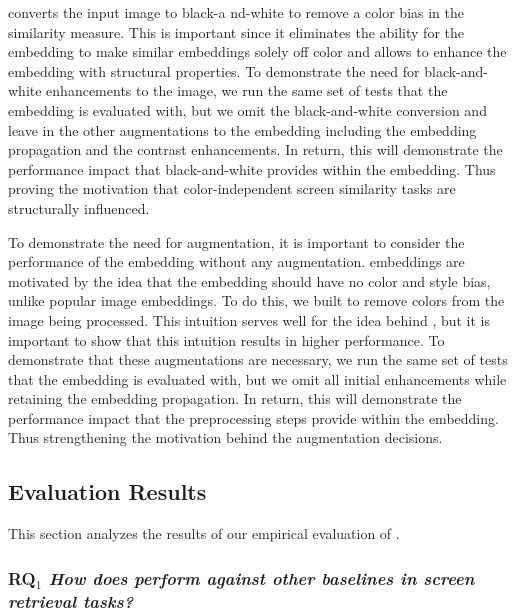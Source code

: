 \FRAME converts the input image to black-a
nd-white to remove a color bias in the similarity measure. This is important since it eliminates the ability for the embedding to make similar embeddings solely off color and allows \FRAME to enhance the embedding with structural properties. To demonstrate the need for black-and-white enhancements to the image, we run the same set of tests that the \FRAME embedding is evaluated with, but we omit the black-and-white conversion and leave in the other augmentations to the embedding including the embedding propagation and the contrast enhancements. In return, this will demonstrate the performance impact that black-and-white provides within the \FRAME embedding. Thus proving the motivation that color-independent screen similarity tasks are structurally influenced.


To demonstrate the need for augmentation, it is important to consider the performance of the embedding without any augmentation. \FRAME embeddings are motivated by the idea that the embedding should have no color and style bias, unlike popular image embeddings. To do this, we built \FRAME to remove colors from the image being processed. This intuition serves well for the idea behind \FRAME, but it is important to show that this intuition results in higher performance. %
To demonstrate that these augmentations are necessary, we run the same set of tests that the \FRAME embedding is evaluated with, but we omit all initial enhancements while retaining the embedding propagation. In return, this will demonstrate the performance impact that the preprocessing steps provide within the \FRAME embedding. Thus strengthening the motivation behind the augmentation decisions.


\subsection{Evaluation Results}

This section analyzes the results of our empirical evaluation of \FRAME. 

\subsubsection{\textbf{RQ$_1$} \textit{How does \FRAME perform against other baselines in screen retrieval tasks?}}

